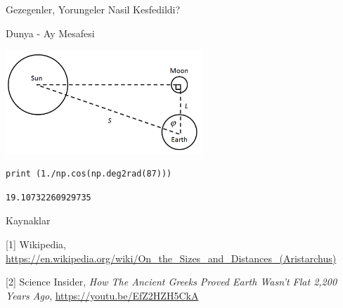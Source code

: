 \documentclass[12pt,fleqn]{article}\usepackage{../../common}
\begin{document}
Gezegenler, Yorungeler Nasil Kesfedildi?

Dunya - Ay Mesafesi

\includegraphics[width=20em]{sunmoon.png}

\begin{verbatim}
print (1./np.cos(np.deg2rad(87)))
\end{verbatim}

\begin{verbatim}
19.10732260929735
\end{verbatim}








Kaynaklar

[1] Wikipedia,
    \url{https://en.wikipedia.org/wiki/On_the_Sizes_and_Distances_(Aristarchus)}

[2] Science Insider, {\em How The Ancient Greeks Proved Earth Wasn't Flat 2,200 Years Ago},
    \url{https://youtu.be/EfZ2HZH5CkA}
    
\end{document}
